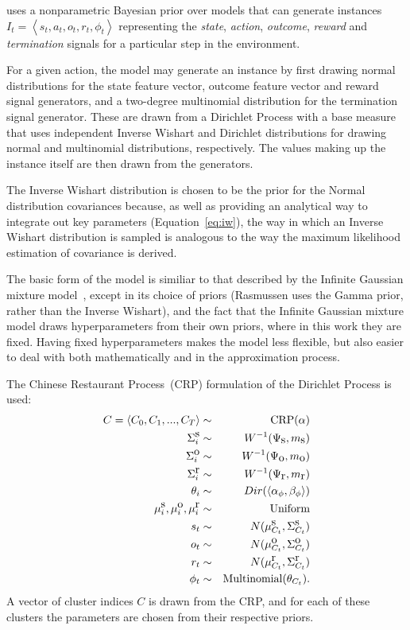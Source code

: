  uses a nonparametric Bayesian prior over models that can generate instances $I_t=\left<s_t, a_t, o_t, r_t, \phi_t\right>$ representing the \emph{state}, \emph{action}, \emph{outcome}, \emph{reward} and \emph{termination} signals for a particular step in the environment.

For a given action, the model may generate an instance by first drawing normal distributions for the state feature vector, outcome feature vector and reward signal generators, and a two-degree multinomial distribution for the termination signal generator. These are drawn from a Dirichlet Process with a base measure that uses independent Inverse Wishart and Dirichlet distributions for drawing normal and multinomial distributions, respectively. The values making up the instance itself are then drawn from the generators.

The Inverse Wishart distribution is chosen to be the prior for the Normal distribution covariances because, as well as providing an analytical way to integrate out key parameters (Equation~\ref{eq:iw}), the way in which an Inverse Wishart distribution is sampled is analogous to the way the maximum likelihood estimation of covariance is derived.

The basic form of the model is similiar to that described by the Infinite Gaussian mixture model~\cite{rasmussen00}, except in its choice of priors (Rasmussen uses the Gamma prior, rather than the Inverse Wishart), and the fact that the Infinite Gaussian mixture model draws hyperparameters from their own priors, where in this work they are fixed. Having fixed hyperparameters makes the model less flexible, but also easier to deal with both mathematically and in the approximation process.

The Chinese Restaurant Process~(CRP) formulation of the Dirichlet Process is used:
\begin{eqnarray*}
C=\left<C_0,C_1,...,C_T\right> &\sim& \mbox{CRP}(\alpha)\\
\Sigma^{\mbox s}_i &\sim& W^{-1}(\Psi_{\mbox s}, m_{\mbox s})\\
\Sigma^{\mbox o}_i &\sim& W^{-1}(\Psi_{\mbox o}, m_{\mbox o})\\
\Sigma^{\mbox r}_i &\sim& W^{-1}(\Psi_{\mbox r}, m_{\mbox r})\\
\theta_i &\sim& Dir(\left<\alpha_\phi, \beta_\phi\right>)\\
\mu^{\mbox s}_i,\mu^{\mbox o}_i,\mu^{\mbox r}_i &\sim& \mbox{Uniform}\\
s_t &\sim& N(\mu^{\mbox s}_{C_t},\Sigma^{\mbox s}_{C_t})\\
o_t &\sim& N(\mu^{\mbox o}_{C_t},\Sigma^{\mbox o}_{C_t})\\
r_t &\sim& N(\mu^{\mbox r}_{C_t},\Sigma^{\mbox r}_{C_t})\\
\phi_t &\sim& \mbox{Multinomial}(\theta_{C_t}).
\end{eqnarray*}
A vector of cluster indices $C$ is drawn from the CRP, and for each of these clusters the parameters are chosen from their respective priors.


